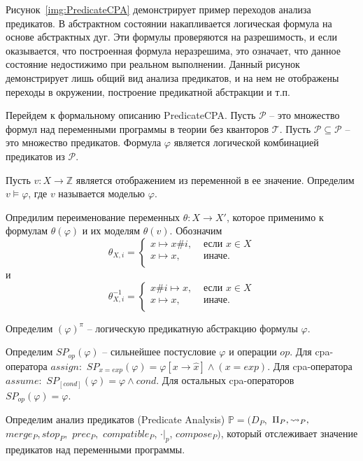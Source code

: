 Рисунок~\ref{img:PredicateCPA} демонстрирует пример переходов анализа предикатов. 
В абстрактном состоянии накапливается логическая формула на основе абстрактных дуг.
Эти формулы проверяются на разрешимость, и если оказывается, что построенная формула неразрешима, это означает, что данное состояние недостижимо при реальном выполнении.
Данный рисунок демонстрирует лишь общий вид анализа предикатов, и на нем не отображены переходы в окружении, построение предикатной абстракции и т.п.

Перейдем к формальному описанию PredicateCPA.
Пусть $\mathscr{P}$ -- это множество формул над переменными программы в теории без кванторов $\mathscr{T}$.
Пусть $\mathcal{P} \subseteq \mathscr{P}$ -- это множество предикатов.
Формула $\varphi$ является логической комбинацией предикатов из $\mathscr{P}$.

Пусть $v: X \to \mathbb{Z}$ является отображением из переменной в ее значение.
Определим $v \models \varphi$, где $v$ называется моделью $\varphi$.

Опредилим переименование переменных $\theta: X \to X'$, которое применимо к формулам $\theta(\varphi)$ и их моделям $\theta(v)$.
Обозначим
$$\theta_{X,i}= 
\left\lbrace\begin{array}{ll}
x \mapsto x\#i, & \mbox{ если } x \in X\\
x \mapsto x, &\mbox{ иначе}.\\
\end{array}
\right.
$$
и
$$\theta_{X,i}^{-1}= 
\left\lbrace\begin{array}{ll}
x\#i \mapsto x, & \mbox{ если } x \in X\\
x \mapsto x, &\mbox{ иначе}.\\
\end{array}
\right.
$$

Определим $(\varphi)^\pi$ -- логическую предикатную абстракцию формулы $\varphi$.

Определим $SP_{op}(\varphi)$ -- сильнейшее постусловие $\varphi$ и операции $op$.
Для cpa-оператора $assign:$ $SP_{x = exp}(\varphi) = \varphi[x \rightarrow \hat x] \land ( x = exp)$.
Для cpa-оператора $assume:$ $SP_{[cond]}(\varphi) = \varphi \land cond$.
Для остальных cpa-операторов $SP_{op}(\varphi) = \varphi$.


Определим анализ предикатов (Predicate Analysis) $\mathbb{P}=(D_{P},$ $\Pi_{P}, \leadsto_{P},$ $merge_{P}, stop_{P},$ $prec_{P},$ $compatible_{P}$, $\cdot|_p$, $compose_P)$, который отслеживает значение предикатов над переменными программы.

